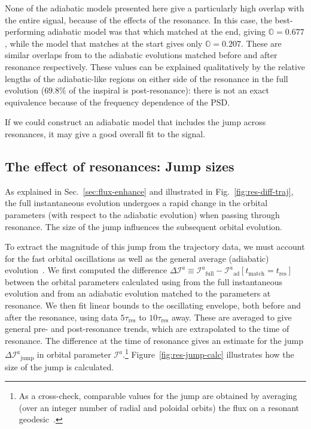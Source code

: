 \documentclass[aps,prd,amsfonts,amssymb,amsmath,nofootinbib,showpacs,superscriptaddress,twocolumn,floatfix]{revtex4-1}
\newcommand{\figref}[1]{Fig.~\ref{fig:#1}}
\newcommand{\Figref}[1]{Figure~\ref{fig:#1}}
\newcommand{\secref}[1]{Sec.~\ref{sec:#1}}
\newcommand{\sub}[1]{\ensuremath{_\mathrm{#1}}}
\begin{document}
None of the adiabatic models presented here give a particularly high overlap with the entire signal, because of the effects of the resonance. In this case, the best-performing adiabatic model was that which matched at the end, giving $\mathbb{O} = 0.677$, while the model that matches at the start gives only $\mathbb{O} = 0.207$. These are similar overlaps from to the adiabatic evolutions matched before and after resonance respectively. These values can be explained qualitatively by the relative lengths of the adiabatic-like regions on either side of the resonance in the full evolution ($69.8\%$ of the inspiral is post-resonance): there is not an exact equivalence because of the frequency dependence of the PSD.

If we could construct an adiabatic model that includes the jump across resonances, it may give a good overall fit to the signal.

\subsection{The effect of resonances: Jump sizes}
\label{sec:effres-jump}

As explained in \secref{flux-enhance} and illustrated in \figref{res-diff-traj}, the full instantaneous evolution undergoes a rapid change in the orbital parameters (with respect to the adiabatic evolution) when passing through resonance. The size of the jump influences the subsequent orbital evolution.

To extract the magnitude of this jump from the trajectory data, we must account for the fast orbital oscillations as well as the general average (adiabatic) evolution~\cite{ColeThesis2015}. We first computed the difference $\Delta \mathcal{I}^a \equiv \mathcal{I}^a\sub{full} - \mathcal{I}^a\sub{ad}[t\sub{match} = t\sub{res}]$ between the orbital parameters calculated using from the full instantaneous evolution and from an adiabatic evolution matched to the parameters at resonance. We then fit linear bounds to the oscillating envelope, both before and after the resonance, using data $5\tau\sub{res}$ to $10\tau\sub{res}$ away. These are averaged to give general pre- and post-resonance trends, which are extrapolated to the time of resonance. The difference at the time of resonance gives an estimate for the jump $\Delta \mathcal{I}^a\sub{jump}$ in orbital parameter $\mathcal{I}^a$.\footnote{As a cross-check, comparable values for the jump are obtained by averaging (over an integer number of radial and poloidal orbits) the flux on a resonant geodesic~\cite{ColeThesis2015}.} \Figref{res-jump-calc} illustrates how the size of the jump is calculated.
\end{document}
